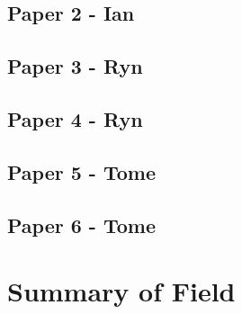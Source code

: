 \documentclass[sigconf,authoryear]{acmart}
\begin{document}
\subsection{Paper 2 - Ian}


\subsection{Paper 3 - Ryn}


\subsection{Paper 4 - Ryn } 

\subsection{Paper 5 - Tome}

\subsection{Paper 6 - Tome}

\section{Summary of Field}
\begin{comment}
    - field summary
    - paragraph
\end{comment}




\end{document}
